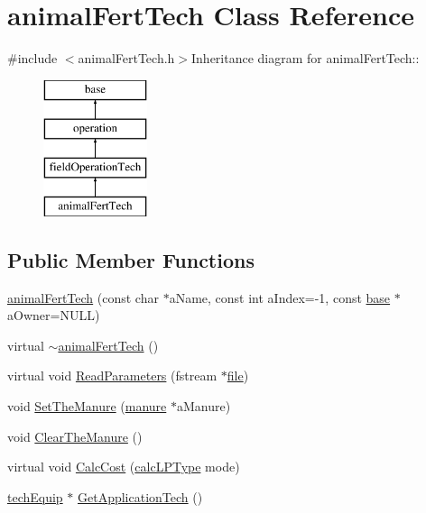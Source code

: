 \hypertarget{classanimal_fert_tech}{
\section{animalFertTech Class Reference}
\label{classanimal_fert_tech}
}


{\ttfamily \#include $<$animalFertTech.h$>$}Inheritance diagram for animalFertTech::\begin{figure}[H]
\begin{center}
\leavevmode
\includegraphics[height=4cm]{classanimal_fert_tech}
\end{center}
\end{figure}
\subsection*{Public Member Functions}
\begin{DoxyCompactItemize}
\item 
\hyperlink{classanimal_fert_tech_a57e661e6eb7baae179ceade5a9ea5271}{animalFertTech} (const char $\ast$aName, const int aIndex=-\/1, const \hyperlink{classbase}{base} $\ast$aOwner=NULL)
\item 
virtual \hyperlink{classanimal_fert_tech_a09f5c3ecb3cbffb70da9f76e2f280b17}{$\sim$animalFertTech} ()
\item 
virtual void \hyperlink{classanimal_fert_tech_ace0ed6c38236d05cd521f98624431767}{ReadParameters} (fstream $\ast$\hyperlink{classbase_a3af52ee9891719d09b8b19b42450b6f6}{file})
\item 
void \hyperlink{classanimal_fert_tech_a70363b032f8bfba796448c7fd4ec0d24}{SetTheManure} (\hyperlink{classmanure}{manure} $\ast$aManure)
\item 
void \hyperlink{classanimal_fert_tech_ad39aff03d336eaa172e7a6e272368165}{ClearTheManure} ()
\item 
virtual void \hyperlink{classanimal_fert_tech_ab2e8f130cf259ed4c7669e92ff1bfebe}{CalcCost} (\hyperlink{typer_8h_af05cf854fc14086a0d6404be5ae9813f}{calcLPType} mode)
\item 
\hyperlink{classtech_equip}{techEquip} $\ast$ \hyperlink{classanimal_fert_tech_a41b5b0183a8047217d79a6bf5c779545}{GetApplicationTech} ()
\end{DoxyCompactItemize}
